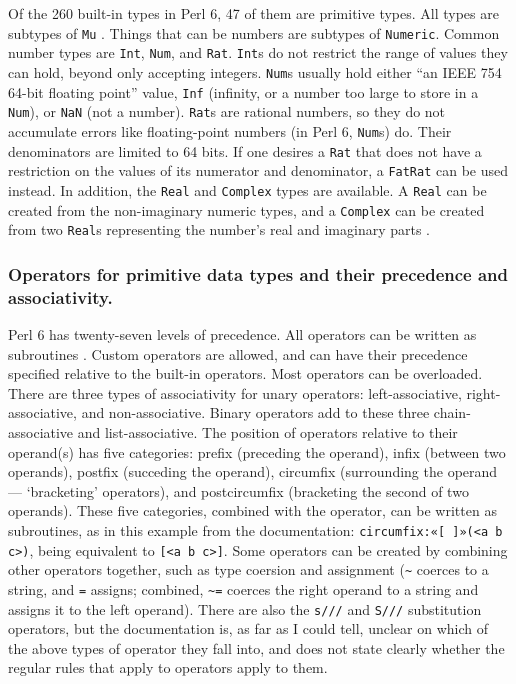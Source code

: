\documentclass[17pt,english]{extarticle}
\begin{document}
Of the 260 built-in types in Perl 6, 47 of them are primitive types.
All types are subtypes of \texttt{Mu} \citep{Documentation}. Things
that can be numbers are subtypes of \texttt{Numeric}. Common number
types are \texttt{Int}, \texttt{Num}, and \texttt{Rat}. \texttt{Int}s
do not restrict the range of values they can hold, beyond only accepting
integers. \texttt{Num}s usually hold either ``an IEEE 754 64-bit
floating point'' \citep{Documentation} value, \texttt{Inf} (infinity,
or a number too large to store in a \texttt{Num}), or \texttt{NaN}
(not a number). \texttt{Rat}s are rational numbers, so they do not
accumulate errors like floating-point numbers (in Perl 6, \texttt{Num}s)
do. Their denominators are limited to 64 bits. If one desires a \texttt{Rat}
that does not have a restriction on the values of its numerator and
denominator, a \texttt{FatRat} can be used instead. In addition, the
\texttt{Real} and \texttt{Complex} types are available. A \texttt{Real}
can be created from the non-imaginary numeric types, and a \texttt{Complex}
can be created from two \texttt{Real}s representing the number's real
and imaginary parts \citep{Documentation}. 


\subsubsection*{Operators for primitive data types and their precedence and associativity.}

Perl 6 has twenty-seven levels of precedence. All operators can be
written as subroutines \citep{Documentation}. Custom operators are
allowed, and can have their precedence specified relative to the built-in
operators. Most operators can be overloaded. There are three types
of associativity for unary operators: left-associative, right-associative,
and non-associative. Binary operators add to these three chain-associative
and list-associative. The position of operators relative to their
operand(s) has five categories: prefix (preceding the operand), infix
(between two operands), postfix (succeding the operand), circumfix
(surrounding the operand — `bracketing' operators), and postcircumfix
(bracketing the second of two operands). These five categories, combined
with the operator, can be written as subroutines, as in this example
from the documentation: \texttt{circumfix:«{[} {]}»(<a b c>)}, being
equivalent to \texttt{{[}<a b c>{]}}. Some operators can be created
by combining other operators together, such as type coersion and assignment
(\texttt{\textasciitilde{}} coerces to a string, and \texttt{=} assigns;
combined, \texttt{\textasciitilde{}=} coerces the right operand to
a string and assigns it to the left operand). There are also the \texttt{s///}
and \texttt{S///} substitution operators, but the documentation is,
as far as I could tell, unclear on which of the above types of operator
they fall into, and does not state clearly whether the regular rules
that apply to operators apply to them.
\end{document}
